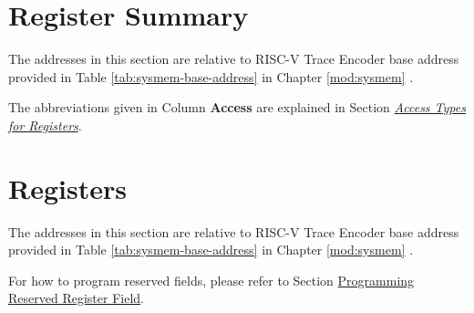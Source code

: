 \documentclass[main\_\_EN.tex]{subfiles}
\begin{document}



\newpage
\hypertarget{riscvtracenc-reg-summ}{}
\section{Register Summary}
\label{sec:riscvtracenc-reg-summ}

The addresses in this section are relative to RISC-V Trace Encoder base address provided in Table \ref{tab:sysmem-base-address} in Chapter \ref{mod:sysmem} \textit{}.

The abbreviations given in Column \textbf{Access} are explained in Section \hyperref[glossary-access-types]{\textit{Access Types for Registers}}.





\newpage
\section{Registers}

The addresses in this section are relative to RISC-V Trace Encoder base address provided in Table \ref{tab:sysmem-base-address} in Chapter \ref{mod:sysmem} \textit{}.

For how to program reserved fields, please refer to Section \hyperref[programming-reserved-field]{Programming Reserved Register Field}.


\end{document}
